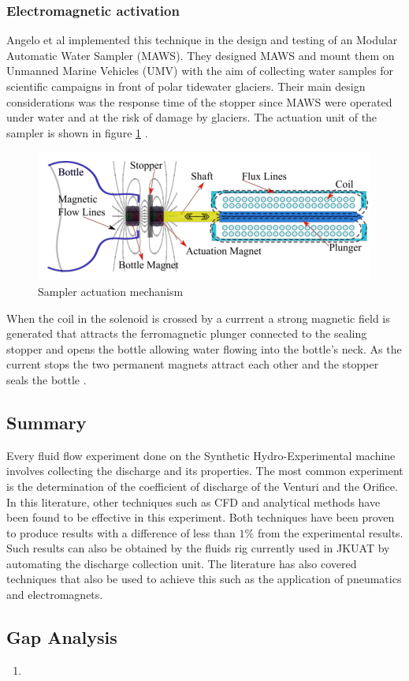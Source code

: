 \subsubsection{Electromagnetic activation}
Angelo et al \cite{odetti2019design} implemented this technique in the design and testing of an Modular Automatic Water Sampler (MAWS). They designed MAWS and mount them on Unmanned Marine Vehicles (UMV) with the aim of collecting water samples for scientific campaigns in front of polar tidewater glaciers. Their main design considerations was the response time of the stopper since MAWS were operated under water and at the risk of damage by glaciers. The actuation unit of the sampler is shown in figure \ref{fig:stopper} . 

\begin{figure}
    \centering
    \includegraphics{Figures/stopper.png}
    \caption{Sampler actuation mechanism \cite{odetti2019design}}
    \label{fig:stopper}
\end{figure}
When the coil in the solenoid is crossed by a currrent a strong magnetic field is generated that attracts the ferromagnetic plunger connected to the sealing stopper and opens the bottle allowing water flowing into the bottle's neck. As the current stops the two permanent magnets attract each other and the stopper seals the bottle \cite{odetti2019design}.

\subsection{Summary}

Every fluid flow experiment done on the Synthetic Hydro-Experimental machine involves collecting the discharge and its properties. The most common experiment is the determination of the coefficient of discharge  of the Venturi and the Orifice. In this literature, other techniques such as CFD and analytical methods have been found to be effective in this experiment. Both techniques have been proven to produce results with a difference of less than $1\%$  from the experimental results. Such results can also be obtained by the fluids rig currently used in JKUAT by automating the discharge collection unit. The literature has also covered techniques that also be used to achieve this such as the application of pneumatics and electromagnets.

\subsection{Gap Analysis}

\begin{enumerate}
    \item 
\end{enumerate}


